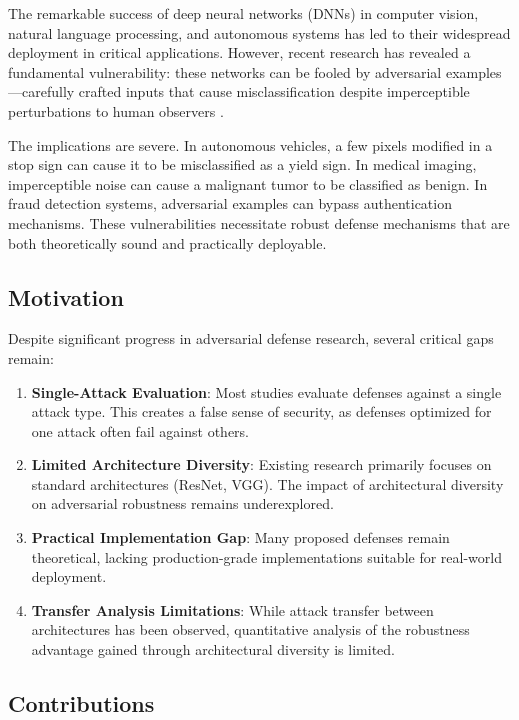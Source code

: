 \documentclass[10pt,conference]{IEEEtran}
\begin{document}
The remarkable success of deep neural networks (DNNs) in computer vision, natural language processing, and autonomous systems has led to their widespread deployment in critical applications. However, recent research has revealed a fundamental vulnerability: these networks can be fooled by adversarial examples—carefully crafted inputs that cause misclassification despite imperceptible perturbations to human observers \cite{goodfellow2014explaining}.

The implications are severe. In autonomous vehicles, a few pixels modified in a stop sign can cause it to be misclassified as a yield sign. In medical imaging, imperceptible noise can cause a malignant tumor to be classified as benign. In fraud detection systems, adversarial examples can bypass authentication mechanisms. These vulnerabilities necessitate robust defense mechanisms that are both theoretically sound and practically deployable.

\subsection{Motivation}

Despite significant progress in adversarial defense research, several critical gaps remain:

\begin{enumerate}
    \item \textbf{Single-Attack Evaluation}: Most studies evaluate defenses against a single attack type. This creates a false sense of security, as defenses optimized for one attack often fail against others.
    
    \item \textbf{Limited Architecture Diversity}: Existing research primarily focuses on standard architectures (ResNet, VGG). The impact of architectural diversity on adversarial robustness remains underexplored.
    
    \item \textbf{Practical Implementation Gap}: Many proposed defenses remain theoretical, lacking production-grade implementations suitable for real-world deployment.
    
    \item \textbf{Transfer Analysis Limitations}: While attack transfer between architectures has been observed, quantitative analysis of the robustness advantage gained through architectural diversity is limited.
\end{enumerate}

\subsection{Contributions}
\end{document}
